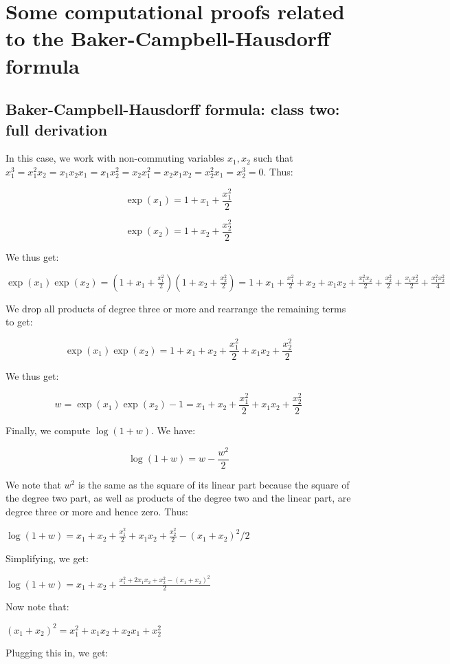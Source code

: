 \section{Some computational proofs related to the Baker-Campbell-Hausdorff formula}

\subsection{Baker-Campbell-Hausdorff formula: class two: full derivation}\label{appsec:bch-class-two}

In this case, we work with non-commuting variables $x_1,x_2$ such that
$x_1^3 = x_1^2x_2 = x_1x_2x_1 = x_1x_2^2 = x_2x_1^2 = x_2x_1x_2 =
x_2^2x_1 = x_2^3 = 0$. Thus:

$$ \exp(x_1) = 1 + x_1 + \frac{x_1^2}{2}$$

$$ \exp(x_2) = 1 + x_2 + \frac{x_2^2}{2}$$

We thus get:

$\exp(x_1)\exp(x_2) = \left(1 + x_1 + \frac{x_1^2}{2}\right)\left(1 + x_2 + \frac{x_2^2}{2}\right) = 1 + x_1 + \frac{x_1^2}{2} + x_2 + x_1x_2 + \frac{x_1^2x_2}{2} + \frac{x_2^2}{2} + \frac{x_1x_2^2}{2} + \frac{x_1^2x_2^2}{4}$

We drop all products of degree three or more and rearrange the remaining terms to get:

$$ \exp(x_1)\exp(x_2) = 1 + x_1 + x_2 + \frac{x_1^2}{2} + x_1x_2 + \frac{x_2^2}{2}$$

We thus get:

$$ w = \exp(x_1)\exp(x_2) - 1 = x_1 + x_2 + \frac{x_1^2}{2} + x_1x_2 + \frac{x_2^2}{2}$$

Finally, we compute $\log(1 + w)$. We have:

$$\log(1 + w) = w - \frac{w^2}{2}$$

We note that $w^2$ is the same as the square of its linear part
because the square of the degree two part, as well as products of the
degree two and the linear part, are degree three or more and hence
zero. Thus:

$\log(1 + w) = x_1 + x_2 + \frac{x_1^2}{2} + x_1x_2 + \frac{x_2^2}{2} - (x_1 + x_2)^2/2$

Simplifying, we get:

$\log(1 + w) = x_1 + x_2 + \frac{x_1^2 + 2x_1x_2 + x_2^2 - (x_1 + x_2)^2}{2}$

Now note that:

$ (x_1 + x_2)^2 = x_1^2 + x_1x_2 + x_2x_1 + x_2^2$

Plugging this in, we get:

